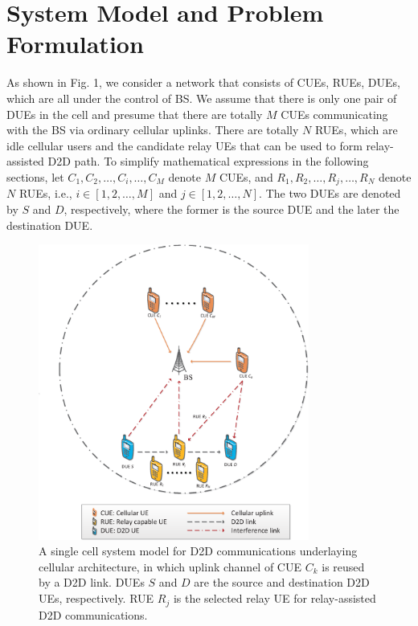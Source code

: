 \documentclass[conference]{IEEEtran}
\begin{document}
\section{System Model and Problem Formulation}
As shown in Fig. 1, we consider a network that consists of CUEs, RUEs, DUEs, which are all under the control of BS. We assume that there is only one pair of DUEs in the cell and presume that there are totally $M$ CUEs communicating with the BS via ordinary cellular uplinks. There are totally $N$ RUEs, which are idle cellular users and the candidate relay UEs that can be used to form relay-assisted D2D path. To simplify mathematical expressions in the following sections, let $C_{1},C_{2},\ldots,C_{i},\ldots,C_{M}$ denote $M$ CUEs, and $R_{1},R_{2},\ldots,R_{j},\ldots,R_{N}$ denote $N$ RUEs, i.e., $i\in\left[1,2,\ldots,M\right]$ and $j\in\left[1,2,\ldots,N\right]$. The two DUEs are denoted by $S$ and $D$, respectively, where the former is the source DUE and the later the destination DUE.
\begin{figure}[!t]
\center
\includegraphics[width=3.5in]{fig1}
\caption{A single cell system model for D2D communications underlaying cellular architecture, in which uplink channel of CUE $C_k$ is reused by a D2D link. DUEs $S$ and $D$ are the source and destination D2D UEs, respectively. RUE $R_j$ is the selected relay UE for relay-assisted D2D communications.}
\label{fig_success}
\end{figure}
\end{document}
